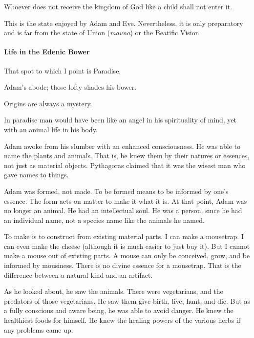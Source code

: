 \begin{quotex}
Whoever does not receive the kingdom of God like a child shall not enter it. 

\end{quotex}
This is the state enjoyed by Adam and Eve. Nevertheless, it is only preparatory and is far from the state of Union (\emph{mauna}) or the Beatific Vision.

\paragraph{Life in the Edenic Bower}
\begin{quotex}
That spot to which I point is Paradise,

Adam's abode; those lofty shades his bower. 

\end{quotex}
Origins are always a mystery.

\begin{quotex}
In paradise man would have been like an angel in his spirituality of mind, yet with an animal life in his body. 

\end{quotex}
Adam awoke from his slumber with an enhanced consciousness. He was able to name the plants and animals. That is, he knew them by their natures or essences, not just as material objects. Pythagoras claimed that it was the wisest man who gave names to things.

Adam was formed, not made. To be formed means to be informed by one's essence. The form acts on matter to make it what it is. At that point, Adam was no longer an animal. He had an intellectual soul. He was a person, since he had an individual name, not a species name like the animals he named.

To make is to construct from existing material parts. I can make a mousetrap. I can even make the cheese (although it is much easier to just buy it). But I cannot make a mouse out of existing parts. A mouse can only be conceived, grow, and be informed by mousiness. There is no divine essence for a mousetrap. That is the difference between a natural kind and an artifact.

As he looked about, he saw the animals. There were vegetarians, and the predators of those vegetarians. He saw them give birth, live, hunt, and die. But as a fully conscious and aware being, he was able to avoid danger. He knew the healthiest foods for himself. He knew the healing powers of the various herbs if any problems came up.

